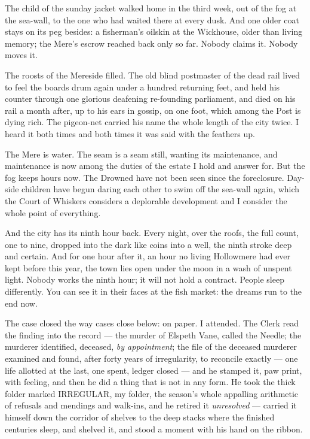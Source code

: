 The child of the sunday jacket walked home in the third week, out of the fog at the sea-wall, to the one who had waited there at every dusk. And one older coat stays on its peg besides: a fisherman's oilskin at the Wickhouse, older than living memory; the Mere's escrow reached back only so far. Nobody claims it. Nobody moves it.

The roosts of the Mereside filled. The old blind postmaster of the dead rail lived to feel the boards drum again under a hundred returning feet, and held his counter through one glorious deafening re-founding parliament, and died on his rail a month after, up to his ears in gossip, on one foot, which among the Post is dying rich. The pigeon-net carried his name the whole length of the city twice. I heard it both times and both times it was said with the feathers up.

The Mere is water. The seam is a seam still, wanting its maintenance, and maintenance is now among the duties of the estate I hold and answer for. But the fog keeps hours now. The Drowned have not been seen since the foreclosure. Day-side children have begun daring each other to swim off the sea-wall again, which the Court of Whiskers considers a deplorable development and I consider the whole point of everything.

And the city has its ninth hour back. Every night, over the roofs, the full count, one to nine, dropped into the dark like coins into a well, the ninth stroke deep and certain. And for one hour after it, an hour no living Hollowmere had ever kept before this year, the town lies open under the moon in a wash of unspent light. Nobody works the ninth hour; it will not hold a contract. People sleep differently. You can see it in their faces at the fish market: the dreams run to the end now.

The case closed the way cases close below: on paper. I attended. The Clerk read the finding into the record --- the murder of Elspeth Vane, called the Needle; the murderer identified, deceased, \emph{by appointment}; the file of the deceased murderer examined and found, after forty years of irregularity, to reconcile exactly --- one life allotted at the last, one spent, ledger closed --- and he stamped it, paw print, with feeling, and then he did a thing that is not in any form. He took the thick folder marked IRREGULAR, my folder, the season's whole appalling arithmetic of refusals and mendings and walk-ins, and he retired it \emph{unresolved} --- carried it himself down the corridor of shelves to the deep stacks where the finished centuries sleep, and shelved it, and stood a moment with his hand on the ribbon.

